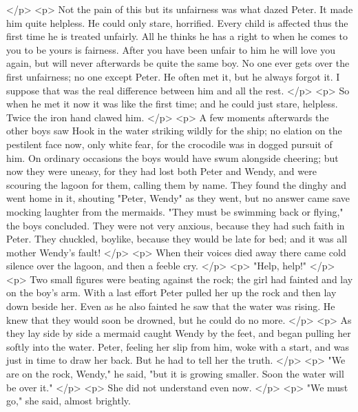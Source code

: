     </p>
    <p>
      Not the pain of this but its unfairness was what dazed Peter. It made him
      quite helpless. He could only stare, horrified. Every child is affected
      thus the first time he is treated unfairly. All he thinks he has a right
      to when he comes to you to be yours is fairness. After you have been
      unfair to him he will love you again, but will never afterwards be quite
      the same boy. No one ever gets over the first unfairness; no one except
      Peter. He often met it, but he always forgot it. I suppose that was the
      real difference between him and all the rest.
    </p>
    <p>
      So when he met it now it was like the first time; and he could just stare,
      helpless. Twice the iron hand clawed him.
    </p>
    <p>
      A few moments afterwards the other boys saw Hook in the water striking
      wildly for the ship; no elation on the pestilent face now, only white
      fear, for the crocodile was in dogged pursuit of him. On ordinary
      occasions the boys would have swum alongside cheering; but now they were
      uneasy, for they had lost both Peter and Wendy, and were scouring the
      lagoon for them, calling them by name. They found the dinghy and went home
      in it, shouting "Peter, Wendy" as they went, but no answer came save
      mocking laughter from the mermaids. "They must be swimming back or
      flying," the boys concluded. They were not very anxious, because they had
      such faith in Peter. They chuckled, boylike, because they would be late
      for bed; and it was all mother Wendy's fault!
    </p>
    <p>
      When their voices died away there came cold silence over the lagoon, and
      then a feeble cry.
    </p>
    <p>
      "Help, help!"
    </p>
    <p>
      Two small figures were beating against the rock; the girl had fainted and
      lay on the boy's arm. With a last effort Peter pulled her up the rock and
      then lay down beside her. Even as he also fainted he saw that the water
      was rising. He knew that they would soon be drowned, but he could do no
      more.
    </p>
    <p>
      As they lay side by side a mermaid caught Wendy by the feet, and began
      pulling her softly into the water. Peter, feeling her slip from him, woke
      with a start, and was just in time to draw her back. But he had to tell
      her the truth.
    </p>
    <p>
      "We are on the rock, Wendy," he said, "but it is growing smaller. Soon the
      water will be over it."
    </p>
    <p>
      She did not understand even now.
    </p>
    <p>
      "We must go," she said, almost brightly.

